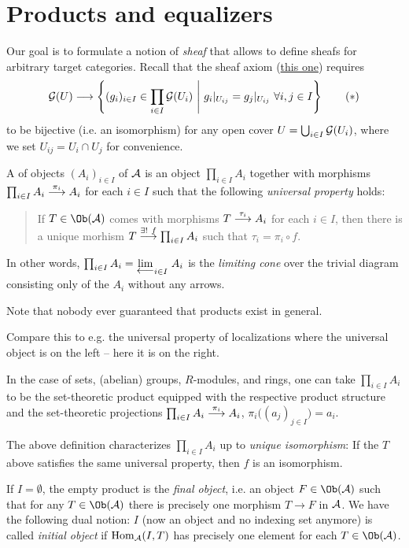 \documentclass[a4paper,parskip=half,numbers=enddot, DIV=12]{scrreprt}
\begin{document}
  \section{Products and equalizers}
  Our goal is to formulate a notion of \emph{sheaf} that allows to define sheafs for arbitrary target categories. Recall that the sheaf axiom (\hyperref[sheafAxiom]{this one}) requires
  \begin{align}\lbl{eq:sheafAxiom}
  	\Gg(U)\longrightarrow\left\{(g_i)_{i\in I}\in\prod_{i\in I}\Gg(U_i)\st g_i|_{U_{ij}}=g_j|_{U_{ij}}\ \forall i,j\in I\right\}\tag{$*$}
  \end{align}
  to be bijective (i.e. an isomorphism) for any open cover $U=\bigcup_{i\in I}\mathcal{G}(U_i)$, where we set $U_{ij}=U_i\cap U_j$ for convenience.
  
  \begin{defi}[products]
  	A  of objects $(A_i)_{i\in I}$ of $\mathcal{A}$ is an object $\prod_{i\in I}A_i$ together with morphisms $\prod_{i\in I}A_i\morphism[\pi_i]A_i$ for each $i\in I$ such that the following \emph{universal property} holds:
  	\begin{quote}
  		If $T\in\Ob(\Aa)$ comes with morphisms $T\morphism[\tau_i]A_i$ for each $i\in I$, then there is a unique morhism $T\morphism[\exists!\ f]\prod_{i\in I}A_i$ such that $\tau_i=\pi_i\circ f$.
  	\end{quote}
  	In other words, $\prod_{i\in I}A_i=\limit[i\in I]{A_i}$ is the \emph{limiting cone} over the trivial diagram consisting only of the $A_i$ without any arrows.
  \end{defi}
  Note that nobody ever guaranteed that products exist in general.
  \begin{rem*}
  	\begin{alphanumerate}
  		\item Compare this to e.g. the universal property of localizations where the universal object is on the left -- here it is on the right.
  		\item In the case of sets, (abelian) groups, $R$-modules, and rings, one can take $\prod_{i\in I}A_i$ to be the set-theoretic product equipped with the respective product structure and the set-theoretic projections $\prod_{i\in I}A_i\morphism[\pi_i]A_i$, $\pi_i\big((a_j)_{j\in I}\big)=a_i$.
  		\item The above definition characterizes $\prod_{i\in I}A_i$ up to \emph{unique isomorphism}: If the $T$ above satisfies the same universal property, then $f$ is an isomorphism.
  		\item If $I=\emptyset$, the empty product is the \emph{final object}, i.e. an object $F\in\Ob(\Aa)$ such that for any $T\in\Ob(\Aa)$ there is precisely one morphism $T\to F$ in $\mathcal{A}$. We have the following dual notion: $I$ (now an object and no indexing set anymore) is called \emph{initial object} if $\operatorname{Hom}_{\mathcal{A}}(I,T)$ has precisely one element for each $T\in\Ob(\Aa)$.
  	\end{alphanumerate}
  \end{rem*}
\end{document}
